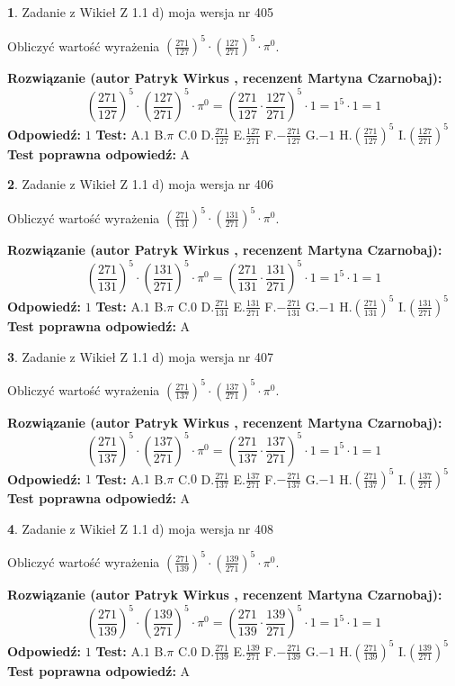 \documentclass[12pt, a4paper]{article}
\theoremstyle{definition} %
\newtheorem{zad}{}
\newcommand{\zadStart}[1]{\begin{zad}#1\newline}
\newcommand{\zadStop}{\end{zad}}
\newcommand{\rozwStart}[2]{\noindent \textbf{Rozwiązanie (autor #1 , recenzent #2): }\newline}
\newcommand{\rozwStop}{\newline}
\newcommand{\odpStart}{\noindent \textbf{Odpowiedź:}\newline}
\newcommand{\odpStop}{\newline}
\newcommand{\testStart}{\noindent \textbf{Test:}\newline}
\newcommand{\testStop}{\newline}
\newcommand{\kluczStart}{\noindent \textbf{Test poprawna odpowiedź:}\newline}
\newcommand{\kluczStop}{\newline}
\begin{document}
\zadStart{Zadanie z Wikieł Z 1.1 d) moja wersja nr 405}

Obliczyć wartość wyrażenia $(\frac{271}{127})^{5} \cdot (\frac{127}{271})^{5} \cdot \pi^{0}$.
\zadStop
\rozwStart{Patryk Wirkus}{Martyna Czarnobaj}
$$(\frac{271}{127})^{5} \cdot (\frac{127}{271})^{5} \cdot \pi^{0} = (\frac{271}{127} \cdot \frac{127}{271})^{5} \cdot 1 = 1^{5} \cdot 1 = 1$$
\rozwStop
\odpStart
$1$
\odpStop
\testStart
A.$1$ B.$\pi$ C.$0$ D.$\frac{271}{127}$ E.$\frac{127}{271}$
F.$-\frac{271}{127}$ G.$-1$
H.$(\frac{271}{127})^{5}$
I.$(\frac{127}{271})^{5}$
\testStop
\kluczStart
A
\kluczStop



\zadStart{Zadanie z Wikieł Z 1.1 d) moja wersja nr 406}

Obliczyć wartość wyrażenia $(\frac{271}{131})^{5} \cdot (\frac{131}{271})^{5} \cdot \pi^{0}$.
\zadStop
\rozwStart{Patryk Wirkus}{Martyna Czarnobaj}
$$(\frac{271}{131})^{5} \cdot (\frac{131}{271})^{5} \cdot \pi^{0} = (\frac{271}{131} \cdot \frac{131}{271})^{5} \cdot 1 = 1^{5} \cdot 1 = 1$$
\rozwStop
\odpStart
$1$
\odpStop
\testStart
A.$1$ B.$\pi$ C.$0$ D.$\frac{271}{131}$ E.$\frac{131}{271}$
F.$-\frac{271}{131}$ G.$-1$
H.$(\frac{271}{131})^{5}$
I.$(\frac{131}{271})^{5}$
\testStop
\kluczStart
A
\kluczStop



\zadStart{Zadanie z Wikieł Z 1.1 d) moja wersja nr 407}

Obliczyć wartość wyrażenia $(\frac{271}{137})^{5} \cdot (\frac{137}{271})^{5} \cdot \pi^{0}$.
\zadStop
\rozwStart{Patryk Wirkus}{Martyna Czarnobaj}
$$(\frac{271}{137})^{5} \cdot (\frac{137}{271})^{5} \cdot \pi^{0} = (\frac{271}{137} \cdot \frac{137}{271})^{5} \cdot 1 = 1^{5} \cdot 1 = 1$$
\rozwStop
\odpStart
$1$
\odpStop
\testStart
A.$1$ B.$\pi$ C.$0$ D.$\frac{271}{137}$ E.$\frac{137}{271}$
F.$-\frac{271}{137}$ G.$-1$
H.$(\frac{271}{137})^{5}$
I.$(\frac{137}{271})^{5}$
\testStop
\kluczStart
A
\kluczStop



\zadStart{Zadanie z Wikieł Z 1.1 d) moja wersja nr 408}

Obliczyć wartość wyrażenia $(\frac{271}{139})^{5} \cdot (\frac{139}{271})^{5} \cdot \pi^{0}$.
\zadStop
\rozwStart{Patryk Wirkus}{Martyna Czarnobaj}
$$(\frac{271}{139})^{5} \cdot (\frac{139}{271})^{5} \cdot \pi^{0} = (\frac{271}{139} \cdot \frac{139}{271})^{5} \cdot 1 = 1^{5} \cdot 1 = 1$$
\rozwStop
\odpStart
$1$
\odpStop
\testStart
A.$1$ B.$\pi$ C.$0$ D.$\frac{271}{139}$ E.$\frac{139}{271}$
F.$-\frac{271}{139}$ G.$-1$
H.$(\frac{271}{139})^{5}$
I.$(\frac{139}{271})^{5}$
\testStop
\kluczStart
A
\kluczStop
\end{document}
